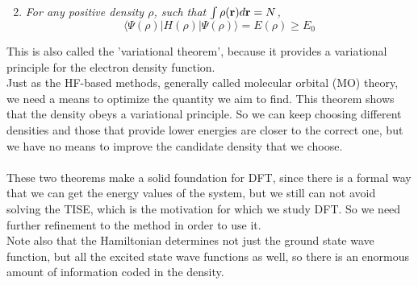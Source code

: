 \begin{enumerate}
    \setcounter{enumi}{1}
    \item \textit{For any positive density $\rho$, such that $\int \rho({\bf r})d{\bf r} = N$,}
    \begin{equation}
        \langle\Psi(\rho)|H(\rho)|\Psi(\rho)\rangle = E(\rho) \geq E_0
    \end{equation}
\end{enumerate}
This is also called the 'variational theorem', because it provides a variational principle for the electron density function. \\
Just as the HF-based methods, generally called molecular orbital (MO) theory, we need a means to optimize the quantity we aim to find. This theorem shows that the density obeys a variational principle. So we can keep choosing different densities and those that provide lower energies are closer to the correct one, but we have no means to improve the candidate density that we choose. \\
\\
These two theorems make a solid foundation for DFT, since there is a formal way that we can get the energy values of the system, but we still can not avoid solving the TISE, which is the motivation for which we study DFT. So we need further refinement to the method in order to use it. \\
Note also that the Hamiltonian determines not just the ground state wave function, but all the excited state wave functions as well, so there is an enormous amount of information coded in the density.

